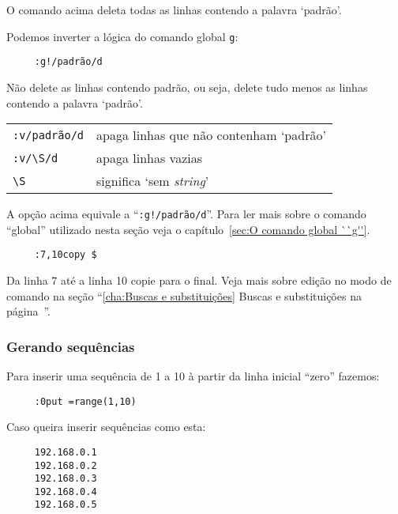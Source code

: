 O comando acima deleta todas as linhas contendo a palavra `padrão'.

Podemos inverter a lógica do comando global \verb+g+:

\begin{verbatim}
     :g!/padrão/d
\end{verbatim}

Não delete as linhas contendo padrão, ou seja, delete tudo menos as linhas
contendo a palavra `padrão'. 

\begin{table}[htb]\begin{center} \begin{tabular}{ll} \hline
     \verb|:v/padrão/d| & apaga linhas que não contenham `padrão'\\
     \verb|:v/\S/d| & apaga linhas vazias\\
     \verb|\S| & significa `sem \textit{string}'\\
\hline \end{tabular}\end{center}\end{table}

A opção acima equivale a ``\verb+:g!/padrão/d+''.  Para ler mais sobre
o comando ``global'' utilizado nesta seção veja o capítulo~\ref{sec:O comando global ``g''}.

\begin{verbatim}
     :7,10copy $
\end{verbatim}

Da linha 7 até a linha 10 copie para o final. {\Large {}}
Veja mais sobre edição no modo de comando na seção ``\ref{cha:Buscas e
substituições} Buscas e substituições na página~\pageref{cha:Buscas e substituições}''.

\subsubsection{Gerando sequências}
Para inserir uma sequência de 1 a 10 à partir da linha inicial ``zero'' fazemos:

\begin{verbatim}
     :0put =range(1,10)
\end{verbatim}

Caso queira inserir sequências como esta:

\begin{verbatim}
     192.168.0.1
     192.168.0.2
     192.168.0.3
     192.168.0.4
     192.168.0.5
\end{verbatim}

